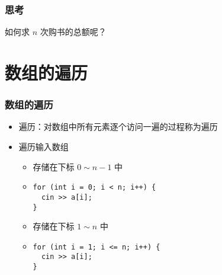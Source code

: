 \begin{frame}[fragile]
    \frametitle{思考}

    \begin{block}{}
        \vspace{.5cm}
        \begin{center}
            如何求 $n$ 次购书的总额呢？
        \end{center}
        \vspace{.5cm}
    \end{block}
\end{frame}


\section{数组的遍历}

\begin{frame}[fragile]
    \frametitle{数组的遍历}

    \begin{overlayarea}{\textwidth}{.66\textheight}
        \begin{itemize}
            \item 遍历：对数组中所有元素逐个访问一遍的过程称为遍历

            \item 遍历输入数组

                \begin{itemize}
                    \item<1-> 存储在下标 $0 \sim n - 1$ 中
                    \item<1->
                        \lstinline|for (int i = 0; i < n; i++) {|\\
                        \lstinline|  cin >> a[i];|\\
                        \lstinline|}|
                    \item<2-> 存储在下标 $1 \sim n$ 中
                    \item<2->
                        \lstinline|for (int i = 1; i <= n; i++) {|\\
                        \lstinline|  cin >> a[i];|\\
                        \lstinline|}|
                \end{itemize}

        \end{itemize}
    \end{overlayarea}
\end{frame}

